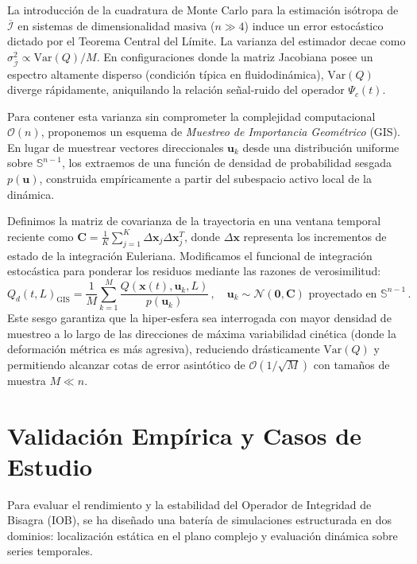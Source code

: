 \documentclass[11pt]{article}
\begin{document}
La introducción de la cuadratura de Monte Carlo para la estimación isótropa de $\overline{\mathcal{I}}$ en sistemas de dimensionalidad masiva ($n \gg 4$) induce un error estocástico dictado por el Teorema Central del Límite. La varianza del estimador decae como $\sigma_{\overline{\mathcal{I}}}^2 \propto \text{Var}(Q) / M$. En configuraciones donde la matriz Jacobiana posee un espectro altamente disperso (condición típica en fluidodinámica), $\text{Var}(Q)$ diverge rápidamente, aniquilando la relación señal-ruido del operador $\Psi_c(t)$.

Para contener esta varianza sin comprometer la complejidad computacional $\mathcal{O}(n)$, proponemos un esquema de \textit{Muestreo de Importancia Geométrico} (GIS). En lugar de muestrear vectores direccionales $\mathbf{u}_k$ desde una distribución uniforme sobre $\mathbb{S}^{n-1}$, los extraemos de una función de densidad de probabilidad sesgada $p(\mathbf{u})$, construida empíricamente a partir del subespacio activo local de la dinámica.

Definimos la matriz de covarianza de la trayectoria en una ventana temporal reciente como $\mathbf{C} = \frac{1}{K} \sum_{j=1}^{K} \Delta \mathbf{x}_{j} \Delta \mathbf{x}_{j}^T$, donde $\Delta \mathbf{x}$ representa los incrementos de estado de la integración Euleriana. Modificamos el funcional de integración estocástica para ponderar los residuos mediante las razones de verosimilitud:
\begin{equation}
    Q_d(t, L)_{\text{GIS}} = \frac{1}{M} \sum_{k=1}^{M} \frac{Q(\mathbf{x}(t), \mathbf{u}_k, L)}{p(\mathbf{u}_k)} \,, \quad \mathbf{u}_k \sim \mathcal{N}(\mathbf{0}, \mathbf{C}) \text{ proyectado en } \mathbb{S}^{n-1} \,.
\end{equation}
Este sesgo garantiza que la hiper-esfera sea interrogada con mayor densidad de muestreo a lo largo de las direcciones de máxima variabilidad cinética (donde la deformación métrica es más agresiva), reduciendo drásticamente $\text{Var}(Q)$ y permitiendo alcanzar cotas de error asintótico de $\mathcal{O}(1/\sqrt{M})$ con tamaños de muestra $M \ll n$.


\newpage
\section{Validación Empírica y Casos de Estudio}
\label{sec:val_empirica}

Para evaluar el rendimiento y la estabilidad del Operador de Integridad de Bisagra (IOB), se ha diseñado una batería de simulaciones estructurada en dos dominios: localización estática en el plano complejo y evaluación dinámica sobre series temporales. 
\end{document}
